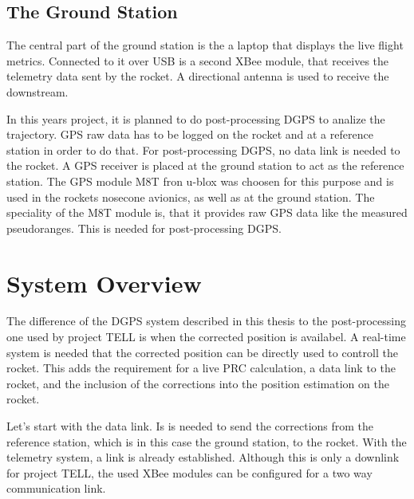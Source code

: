 \subsection{The Ground Station}

The central part of the ground station is the a laptop that displays the live flight metrics.
Connected to it over USB is a second XBee module, that receives the telemetry data sent by the rocket.
A directional antenna is used to receive the downstream.

In this years project, it is planned to do post-processing DGPS to analize the trajectory.
GPS raw data has to be logged on the rocket and at a reference station in order to do that.
For post-processing DGPS, no data link is needed to the rocket.
A GPS receiver is placed at the ground station to act as the reference station.
The GPS module M8T fron u-blox was choosen for this purpose and is used in the rockets nosecone avionics, as well as at the ground station.
The speciality of the M8T module is, that it provides raw GPS data like the measured pseudoranges.
This is needed for post-processing DGPS.


\section{System Overview}\label{sec:system_overview}

The difference of the DGPS system described in this thesis to the post-processing one used by project TELL is when the corrected position is availabel.
A real-time system is needed that the corrected position can be directly used to controll the rocket.
This adds the requirement for a live PRC calculation, a data link to the rocket, and the inclusion of the corrections into the position estimation on the rocket.

Let's start with the data link.
Is is needed to send the corrections from the reference station, which is in this case the ground station, to the rocket.
With the telemetry system, a link is already established.
Although this is only a downlink for project TELL, the used XBee modules can be configured for a two way communication link.

